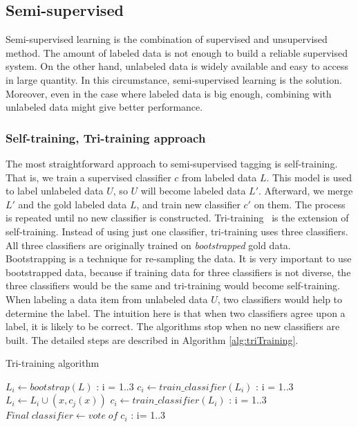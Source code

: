 \subsection{Semi-supervised}
Semi-supervised learning is the combination of supervised and unsupervised method. The amount of labeled data is not enough to build a reliable supervised system. On the other hand, unlabeled data is widely available and easy to access in large quantity. In this circumstance, semi-supervised learning is the solution. Moreover, even in the case where labeled data is big enough, combining with unlabeled data might give better performance. 

\subsubsection{Self-training, Tri-training approach}
The most straightforward approach to semi-supervised tagging is self-training. That is, we train a supervised classifier $c$ from labeled data $L$. This model is used to label unlabeled data $U$, so $U$ will become labeled data $L'$. Afterward, we merge $L'$ and the gold labeled data $L$, and train new classifier $c'$ on them. The process is repeated until no new classifier is constructed. Tri-training~\cite{triTraining} is the extension of self-training. Instead of using just one classifier, tri-training uses three classifiers. All three classifiers are originally trained on \textit{bootstrapped} gold data. Bootstrapping is a technique for re-sampling the data. It is very important to use bootstrapped data, because if training data for three classifiers is not diverse, the three classifiers would be the same and tri-training would become self-training. When labeling a data item from unlabeled data $U$, two classifiers would help to determine the label. The intuition here is that when two classifiers agree upon a label, it is likely to be correct. The algorithms stop when no new classifiers are built. The detailed steps are described in Algorithm \ref{alg:triTraining}. 
\begin{algorithm}
\caption{Tri-training algorithm}
\label{alg:triTraining}
\begin{algorithmic}[1] 
\STATE $L_i \leftarrow bootstrap(L) $ : i = 1..3
\STATE $c_i \leftarrow train\_classifier(L_i)$ : i = 1..3
\REPEAT
{}
	\STATE $L_i \leftarrow L_i \cup (x,c_j(x))$		
	\ENDIF
\ENDFOR
\STATE $c_i \leftarrow train\_classifier(L_i)$ : i = 1..3
\ENDFOR
{}
\STATE $Final\; classifier \leftarrow vote\; of\; c_i $ : i= 1..3
\end{algorithmic}
\end{algorithm}

